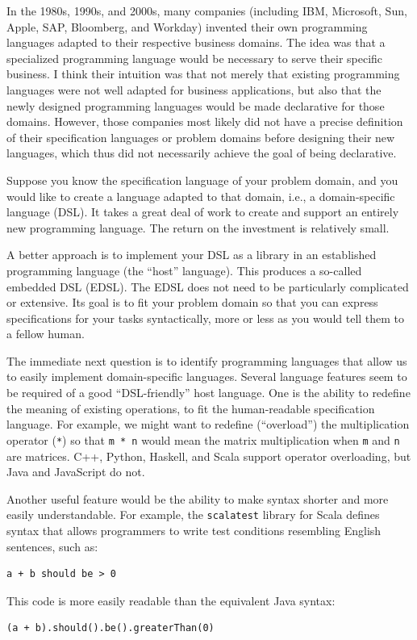 In the 1980s, 1990s, and 2000s, many companies (including IBM, Microsoft,
Sun, Apple, SAP, Bloomberg, and Workday) invented their own programming
languages adapted to their respective business domains. The idea was
that a specialized programming language would be necessary to serve
their specific business. I think their intuition was that not merely
that existing programming languages were not well adapted for business
applications, but also that the newly designed programming languages
would be made declarative for those domains. However, those companies
most likely did not have a precise definition of their specification
languages or problem domains before designing their new languages,
which thus did not necessarily achieve the goal of being declarative.

Suppose you know the specification language of your problem domain,
and you would like to create a language adapted to that domain, i.e.,
a domain-specific language (DSL). It takes a great deal of work to
create and support an entirely new programming language. The return
on the investment is relatively small.

A better approach is to implement your DSL as a library in an established
programming language (the \textsf{``}host\textsf{''} language). This produces a so-called
embedded DSL (EDSL). The EDSL does not need to be particularly complicated
or extensive. Its goal is to fit your problem domain so that you can
express specifications for your tasks syntactically, more or less
as you would tell them to a fellow human.

The immediate next question is to identify programming languages that
allow us to easily implement domain-specific languages. Several language
features seem to be required of a good \textsf{``}DSL-friendly\textsf{''} host language.
One is the ability to redefine the meaning of existing operations,
to fit the human-readable specification language. For example, we
might want to redefine (\textsf{``}overload\textsf{''}) the multiplication operator
(\lstinline!*!) so that \lstinline!m * n! would mean the matrix
multiplication when \lstinline!m! and \lstinline!n! are matrices.
C++, Python, Haskell, and Scala support operator overloading, but
Java and JavaScript do not.

Another useful feature would be the ability to make syntax shorter
and more easily understandable. For example, the \lstinline!scalatest!
library for Scala defines syntax that allows programmers to write
test conditions resembling English sentences, such as:
\begin{lstlisting}
a + b should be > 0
\end{lstlisting}
This code is more easily readable than the equivalent Java syntax:
\begin{lstlisting}
(a + b).should().be().greaterThan(0)
\end{lstlisting}

